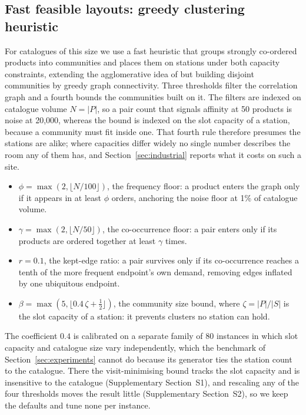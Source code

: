 \documentclass[]{interact}
\begin{document}
\subsection{Fast feasible layouts: greedy clustering heuristic}\label{sec:heuristic}
For catalogues of this size we use a fast heuristic that groups strongly co-ordered products into communities and places them on stations under both capacity constraints, extending the agglomerative idea of \citet{chuang2016} but building disjoint communities by greedy graph connectivity. Three thresholds filter the correlation graph and a fourth bounds the communities built on it. The filters are indexed on catalogue volume $N=|P|$, so a pair count that signals affinity at 50 products is noise at 20,000, whereas the bound is indexed on the slot capacity of a station, because a community must fit inside one. That fourth rule therefore presumes the stations are alike; where capacities differ widely no single number describes the room any of them has, and Section~\ref{sec:industrial} reports what it costs on such a site.
\begin{itemize}
\item $\phi=\max(2,\lfloor N/100\rfloor)$, the frequency floor: a product enters the graph only if it appears in at least $\phi$ orders, anchoring the noise floor at 1\% of catalogue volume.
\item $\gamma=\max(2,\lfloor N/50\rfloor)$, the co-occurrence floor: a pair enters only if its products are ordered together at least $\gamma$ times.
\item $r=0.1$, the kept-edge ratio: a pair survives only if its co-occurrence reaches a tenth of the more frequent endpoint's own demand, removing edges inflated by one ubiquitous endpoint.
\item $\beta=\max\!\left(5,\big\lfloor 0.4\,\zeta+\tfrac12 \big\rfloor\right)$, the community size bound, where $\zeta=|P|/|S|$ is the slot capacity of a station: it prevents clusters no station can hold.
\end{itemize}
The coefficient $0.4$ is calibrated on a separate family of 80 instances in which slot capacity and catalogue size vary independently, which the benchmark of Section~\ref{sec:experiments} cannot do because its generator ties the station count to the catalogue. There the visit-minimising bound tracks the slot capacity and is insensitive to the catalogue (Supplementary Section~S1), and rescaling any of the four thresholds moves the result little (Supplementary Section~S2), so we keep the defaults and tune none per instance.
\end{document}
